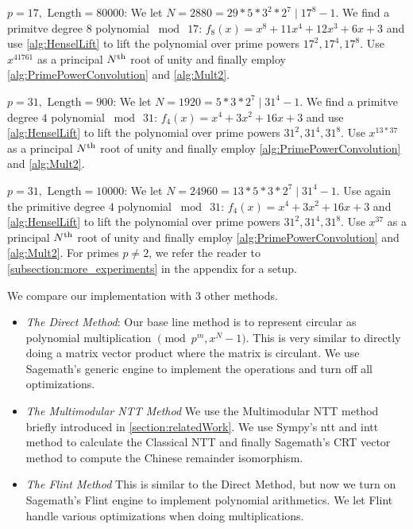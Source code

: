 {\bf \(p = 17, \text{ Length} = 80000\)}: We let \(N = 2880 = 29 * 5 * 3^2 * 2^7 \mid 17^{8} - 1\). We find a primitve degree \(8\) polynomial \(\bmod \  17\): \(f_{8}(x) = x^8 + 11x^4 + 12x^3 + 6x + 3\) and use \cref{alg:HenselLift} to lift the polynomial over prime powers \(17^2, 17^4, 17^8\). Use \(x^{41761} \) as a principal \(N\textsuperscript{th}\) root of unity and finally employ \cref{alg:PrimePowerConvolution} and \cref{alg:Mult2}.

{\bf \(p = 31, \text{ Length} = 900\)}: We let \(N = 1920 = 5 * 3 * 2^7 \mid 31^{4} - 1\). We find a primitve degree \(4\) polynomial \(\bmod \  31\): \(f_{4}(x) = x^4 + 3x^2 + 16x + 3\) and use \cref{alg:HenselLift} to lift the polynomial over prime powers \(31^2, 31^4, 31^8\). Use \(x^{13*37} \) as a principal \(N\textsuperscript{th}\) root of unity and finally employ \cref{alg:PrimePowerConvolution} and \cref{alg:Mult2}.

{\bf \(p = 31, \text{ Length} = 10000\)}: We let \(N = 24960 = 13 * 5 * 3 * 2^7 \mid 31^{4} - 1\). Use again the primitive degree \(4\) polynomial \(\bmod \  31\): \(f_{4}(x) = x^4 + 3x^2 + 16x + 3\) and \cref{alg:HenselLift} to lift the polynomial over prime powers \(31^2, 31^4, 31^8\). Use \(x^{37} \) as a principal \(N\textsuperscript{th}\) root of unity and finally employ \cref{alg:PrimePowerConvolution} and \cref{alg:Mult2}.
\else
For primes \(p \ne 2\), we refer the reader to \cref{subsection:more_experiments} in the appendix for a setup.
\fi

We compare our implementation with 3 other methods.
\begin{itemize}
    \item \emph{The Direct Method}: Our base line method is to represent circular as polynomial multiplication \(\pmod{p^m, x^N - 1}\). This is very similar to directly doing a matrix vector product where the matrix is circulant. We use Sagemath's generic engine to implement the operations and turn off all optimizations.
    \item \emph{The Multimodular NTT Method} We use the Multimodular NTT method briefly introduced in \cref{section:relatedWork}. We use Sympy's ntt and intt method to calculate the Classical NTT and finally Sagemath's CRT vector method to compute the Chinese remainder isomorphism.
    \item \emph{The Flint Method} This is similar to the Direct Method, but now we turn on Sagemath's Flint engine to implement polynomial arithmetics. We let Flint \cite{OTHER:FLINT} handle various optimizations when doing multiplications.
\end{itemize}

